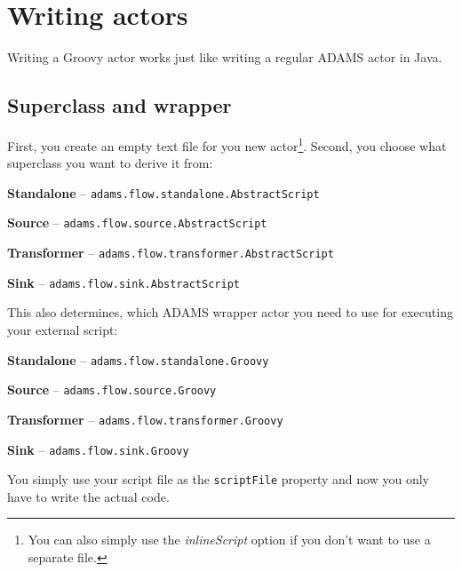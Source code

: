 \documentclass[a4paper]{book}
\begin{document}
\chapter{Writing actors}
Writing a Groovy actor works just like writing a regular ADAMS actor in Java.

\section{Superclass and wrapper}
First, you create an empty text file for you new 
actor\footnote{You can also simply use the \textit{inlineScript} option if you don't 
want to use a separate file.}. Second, you choose what superclass you want to derive it from:
\begin{tight_itemize}
	\item \textbf{Standalone} -- \texttt{adams.flow.standalone.AbstractScript}
	\item \textbf{Source} -- \texttt{adams.flow.source.AbstractScript}
	\item \textbf{Transformer} -- \texttt{adams.flow.transformer.AbstractScript}
	\item \textbf{Sink} -- \texttt{adams.flow.sink.AbstractScript}
\end{tight_itemize}
This also determines, which ADAMS wrapper actor you need to use for executing
your external script:
\begin{tight_itemize}
	\item \textbf{Standalone} -- \texttt{adams.flow.standalone.Groovy}
	\item \textbf{Source} -- \texttt{adams.flow.source.Groovy}
	\item \textbf{Transformer} -- \texttt{adams.flow.transformer.Groovy}
	\item \textbf{Sink} -- \texttt{adams.flow.sink.Groovy}
\end{tight_itemize}
You simply use your script file as the \texttt{scriptFile} property and now you
only have to write the actual code.

\newpage
\end{document}
